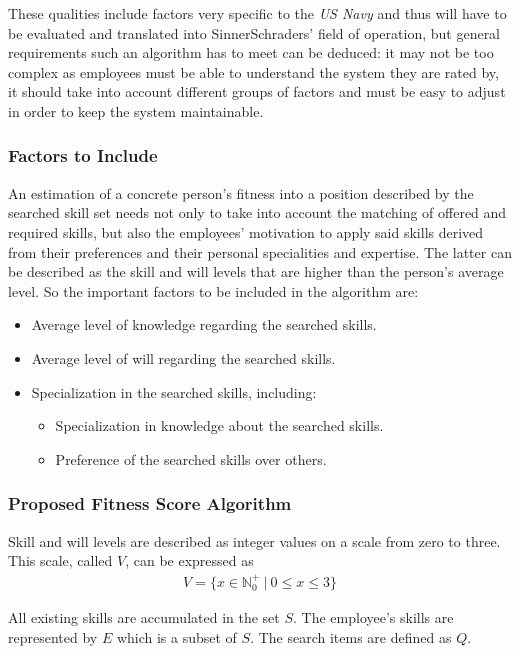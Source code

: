 \label{customizable}
These qualities include factors very specific to the \textit{US Navy} and thus will have to be evaluated and translated into SinnerSchraders' field of operation, but general requirements such an algorithm has to meet can be deduced: it may not be too complex as employees must be able to understand the system they are rated by, it should take into account different groups of factors and must be easy to adjust in order to keep the system maintainable.

\subsubsection{Factors to Include}
An estimation of a concrete person's fitness into a position described by the searched skill set needs not only to take into account the matching of offered and required skills, but also the employees' motivation to apply said skills derived from their preferences and their personal specialities and expertise. The latter can be described as the skill and will levels that are higher than the person's average level. So the important factors to be included in the algorithm are:
\begin{itemize}
  \item Average level of knowledge regarding the searched skills.
  \item Average level of will regarding the searched skills.
  \item Specialization in the searched skills, including:
  \begin{itemize}
    \item Specialization in knowledge about the searched skills.
    \item Preference of the searched skills over others.
  \end{itemize}
\end{itemize}


\subsubsection{Proposed Fitness Score Algorithm}
Skill and will levels are described as integer values on a scale from zero to three. This scale, called $V$, can be expressed as
\begin{gather*}
  V = \{ x \in \mathbb{N}_0^+ \ | \  0 \leq x \leq 3\}
\end{gather*}

All existing skills are accumulated in the set $S$. The employee's skills are represented by $E$ which is a subset of $S$. The search items are
defined as $Q$.

